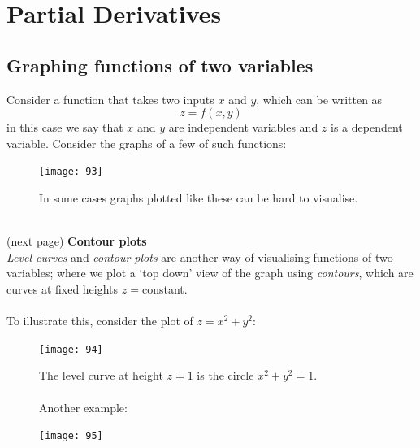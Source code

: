 \documentclass{report}
\begin{document}
\section{Partial Derivatives}
\subsection{Graphing functions of two variables}
Consider a function that takes two inputs $x$ and $y$, which can be written as
\begin{equation*}
z=f(x,y)
\end{equation*}
in this case we say that $x$ and $y$ are independent variables and $z$ is a dependent variable. Consider the 
graphs of a few of such functions:
\begin{figure}[h]
\begin{center}
\texttt{[image: 93]}\\
\end{center}
In some cases graphs plotted like these can be hard to visualise.
\end{figure}\\
(next page)
\newpage
\noindent\textbf{Contour plots}\\
\textit{Level curves} and \textit{contour plots} are another way of visualising functions of two variables; where 
we plot a `top down' view of the graph using \textit{contours}, which are curves at fixed heights $z=$constant.\\
\vspace{1mm}\\
To illustrate this, consider the plot of $z=x^2+y^2$:
\begin{figure}[h]
\begin{center}
\texttt{[image: 94]}\\
\end{center}
The level curve at height $z=1$ is the circle $x^2+y^2=1$.\\
\vspace{1mm}\\
Another example:
\begin{center}
\texttt{[image: 95]}\\
\end{center}
\end{figure}
\newpage
\end{document}
